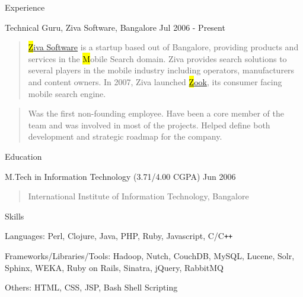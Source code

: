\documentclass{resume}
\author{Siddhartha Reddy Kothakapu}
\begin{document}
 \maketitle


\begin{category}{Experience}{}

    \item {\topic Technical Guru,} Ziva Software, Bangalore
        {\period Jul 2006 - Present}
        \begin{quote}
            \href{http://www.zook.in/}{{\hl Ziva Software}} is a startup based
            out of Bangalore, providing products and services in the {\hl
            Mobile Search} domain. Ziva provides search solutions to several
            players in the mobile industry including operators, manufacturers
            and content owners. In 2007, Ziva launched
            \href{http://www.zook.in/}{{\hl Zook}}, its consumer facing mobile
            search engine.
        \end{quote}
        \begin{quote}
            Was the first non-founding employee. Have been a core member of
            the team and was involved in most of the projects. Helped define
            both development and strategic roadmap for the company.
        \end{quote}

\end{category}


\begin{category}{Education}{}

    \item {\topic M.Tech in Information Technology}
        {\footnotesize(3.71/4.00 CGPA)}
        {\period Jun 2006}
        \begin{quote}
            International Institute of Information Technology, Bangalore
        \end{quote}

\end{category}


\begin{category}{Skills}{}

    \item {\topic Languages:} Perl, Clojure, Java, PHP, Ruby, Javascript,
    C/C{\tt ++}

    \item {\topic Frameworks/Libraries/Tools:} Hadoop, Nutch, CouchDB, MySQL,
    Lucene, Solr, Sphinx, WEKA, Ruby on Rails, Sinatra, jQuery, RabbitMQ

    \item {\topic Others:} HTML, CSS, JSP, Bash Shell Scripting

\end{category}
\end{document}
